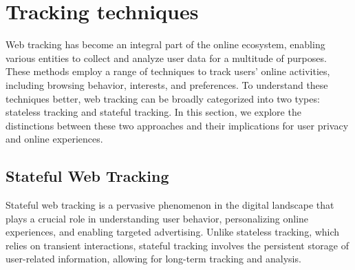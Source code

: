 

\section{Tracking techniques}

Web tracking has become an integral part of the online ecosystem, enabling various 
entities to collect and analyze user data for a multitude of purposes. These methods
employ a range of techniques to track users' online activities, including browsing behavior,
interests, and preferences. To understand these techniques better, web tracking can be broadly
categorized into two types: stateless tracking and stateful tracking. In this section, we explore
the distinctions between these two approaches and their implications for user privacy and online experiences.

\subsection{Stateful Web Tracking}
Stateful web tracking is a pervasive phenomenon in the digital landscape that plays a crucial role in understanding user behavior,
personalizing online experiences, and enabling targeted advertising. Unlike stateless tracking, which relies on transient interactions,
stateful tracking involves the persistent storage of user-related information, allowing for long-term tracking and analysis. 

